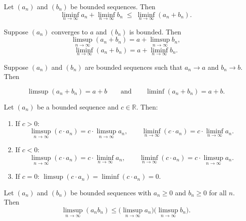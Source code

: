 \begin{theorem}
Let $(a_n)$ and $(b_n)$ be bounded sequences. Then
\[
\liminf_{n\to\infty} a_n
+
\liminf_{n\to\infty} b_n
\;\le\;
\liminf_{n\to\infty} (a_n + b_n).
\]
\end{theorem}



\begin{theorem}
Suppose $(a_n)$ converges to $a$ and $(b_n)$ is bounded. Then
\[
\limsup_{n\to\infty}(a_n + b_n) = a + \limsup_{n\to\infty} b_n,
\]
\[
\liminf_{n\to\infty}(a_n + b_n) = a + \liminf_{n\to\infty} b_n.
\]
\end{theorem}



\begin{theorem}
Suppose $(a_n)$ and $(b_n)$ are bounded sequences such that
$a_n \to a$ and $b_n \to b$. Then

\[
\limsup (a_n + b_n) = a + b
\qquad \text{and} \qquad
\liminf (a_n + b_n) = a + b.
\]
\end{theorem}



\begin{theorem}
Let $(a_n)$ be a bounded sequence and $c \in \mathbb{R}$. Then:
\begin{enumerate}
\item If $c > 0$:
\[
\limsup_{n\to\infty}(c \cdot a_n) = c \cdot \limsup_{n\to\infty} a_n,
\qquad
\liminf_{n\to\infty}(c \cdot a_n) = c \cdot \liminf_{n\to\infty} a_n.
\]
\item If $c < 0$:
\[
\limsup_{n\to\infty}(c \cdot a_n) = c \cdot \liminf_{n\to\infty} a_n,
\qquad
\liminf_{n\to\infty}(c \cdot a_n) = c \cdot \limsup_{n\to\infty} a_n.
\]
\item If $c = 0$: $\limsup(c \cdot a_n) = \liminf(c \cdot a_n) = 0$.
\end{enumerate}
\end{theorem}



\begin{theorem}
Let $(a_n)$ and $(b_n)$ be bounded sequences with $a_n \ge 0$ and $b_n \ge 0$ for all $n$. Then
\[
\limsup_{n\to\infty}(a_n b_n) \le \bigl(\limsup_{n\to\infty} a_n\bigr)\bigl(\limsup_{n\to\infty} b_n\bigr).
\]
\end{theorem}



